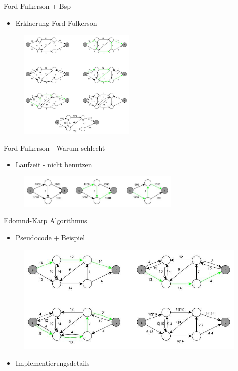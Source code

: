 \documentclass[18pt]{beamer}
\begin{document}
\begin{frame}{Ford-Fulkerson + Bsp}
\begin{itemize}
\item Erklaerung Ford-Fulkerson
\end{itemize}
\begin{figure}
\includegraphics[width = 0.5\textwidth]{img/Jakob_Ford.jpg}
\end{figure}
\end{frame}


\begin{frame}{Ford-Fulkerson - Warum schlecht}
\begin{itemize}
\item Laufzeit - nicht benutzen
\end{itemize}
\begin{figure}
\includegraphics[width = 0.7\textwidth]{img/Jakob_Ford2.jpg}
\end{figure}
\end{frame}


\begin{frame}{Edomnd-Karp Algorithmus}
\begin{itemize}
\item Pseudocode + Beispiel
\end{itemize}
\begin{figure}
\includegraphics[width = \textwidth]{img/Jakob_Edmond.jpg}
\end{figure}

\begin{itemize}
\item Implementierungsdetails
\end{itemize}
\end{frame}
\end{document}

